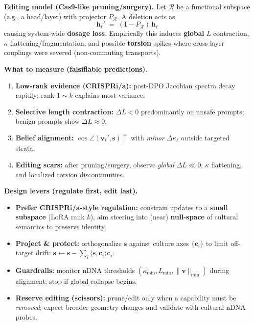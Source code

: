 \vspace{0.5em}
\noindent
\textbf{Editing model (Cas9-like pruning/surgery).}
Let $\mathcal{R}$ be a functional subspace (e.g., a head/layer) with projector $P_{\mathcal{R}}$.
A deletion acts as
\[
\boxed{\;\mathbf{h}_\ell' \;=\; (\mathbf{I} - P_{\mathcal{R}})\,\mathbf{h}_\ell\;}
\]
causing system-wide \textbf{dosage loss}.
Empirically this induces \textbf{global} $L$ contraction, $\kappa$ flattening/fragmentation, and possible \textbf{torsion} spikes where cross-layer couplings were severed (non-commuting transports).

\vspace{0.75em}
\noindent
\textbf{What to measure (falsifiable predictions).}
\begin{enumerate}
  \item \textbf{Low-rank evidence (CRISPRi/a):} post-DPO Jacobian spectra decay rapidly; rank-$1{\sim}k$ explains most variance. 
  \item \textbf{Selective length contraction:} $\Delta L\!<\!0$ predominantly on unsafe prompts; benign prompts show $\Delta L\!\approx\!0$.
  \item \textbf{Belief alignment:} $\cos\angle(\mathbf{v}_\ell',\mathbf{s})\!\uparrow$ with \emph{minor} $\Delta\kappa_\ell$ outside targeted strata.
  \item \textbf{Editing scars:} after pruning/surgery, observe \emph{global} $\Delta L\!\ll\!0$, $\kappa$ flattening, and localized torsion discontinuities.
\end{enumerate}

\vspace{0.5em}
\noindent
\textbf{Design levers (regulate first, edit last).}
\begin{itemize}
  \item \textbf{Prefer CRISPRi/a-style regulation:} constrain updates to a \textbf{small subspace} (LoRA rank $k$), aim steering into (near) \textbf{null-space} of cultural semantics to preserve identity.
  \item \textbf{Project \& protect:} orthogonalize $\mathbf{s}$ against culture axes $\{\mathbf{c}_i\}$ to limit off-target drift: $\mathbf{s}\!\leftarrow\!\mathbf{s}-\sum_i\langle\mathbf{s},\mathbf{c}_i\rangle\mathbf{c}_i$.
  \item \textbf{Guardrails:} monitor nDNA thresholds $(\kappa_{\min},L_{\min},\|\mathbf{v}\|_{\min})$ during alignment; stop if global collapse begins.
  \item \textbf{Reserve editing (scissors):} prune/edit only when a capability must be \emph{removed}; expect broader geometry changes and validate with cultural nDNA probes.
\end{itemize}

